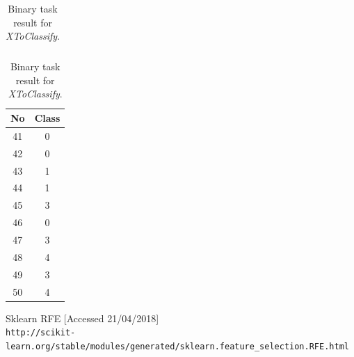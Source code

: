 \documentclass[11pt]{article}
\begin{document}
\begin{center}
\begin{table}[h]
\begin{tabular}[b]{| c | c|}
				\hline
			\end{tabular}
			\begin{tabular}[b]{| c | c|} 
				\hline
				No & Class \\
				\hline
				 41 & 0 \\ 42 & 0 \\ 43 & 1 \\ 44 & 1 \\ 45 & 3 \\ 46 & 0 \\ 47 & 3 \\ 48 & 4 \\ 49 & 3 \\ 50 & 4 \\
				\hline
			\end{tabular}
			\caption{Binary task result for \textit{XToClassify}.}
			\label{tbl:final_binary}
			\end{table}
		\end{center}

 
 


	\clearpage

	\begin{thebibliography}{9}

		Sklearn RFE [Accessed 21/04/2018]
		\\\texttt{http://scikit-learn.org/stable/modules/generated/sklearn.feature\_selection.RFE.html}

	\end{thebibliography}
\end{document}
